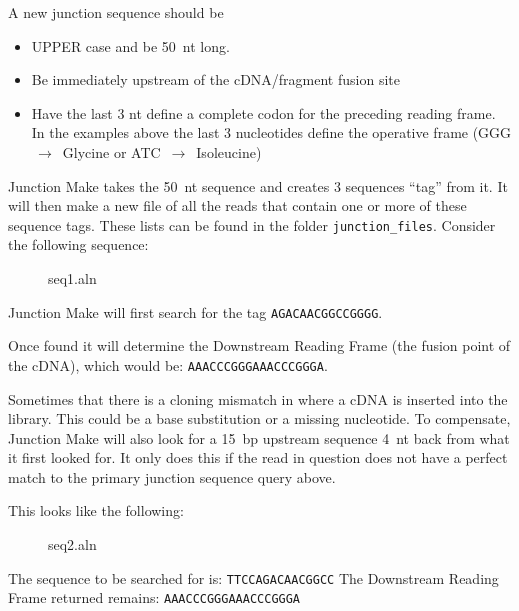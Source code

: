 \documentclass[11pt,fleqn]{book} %
\newcommand{\JunctionMake}{{\color{Blue} Junction Make }}
\begin{document}
\begin{remark}
A new junction sequence should be 
\begin{itemize}
	\item UPPER case and be 50~nt long.
	\item Be immediately upstream of the cDNA/fragment fusion site
	\item Have the last 3 nt define a complete codon for the preceding reading frame. In the examples above the last 3 nucleotides define the operative frame (GGG $\,\to\,$ Glycine or ATC $\,\to\,$ Isoleucine)
\end{itemize}
\end{remark}



\JunctionMake takes the 50~nt sequence and creates 3 sequences ``tag'' from it.  It will then make a new file of all the reads that contain one or more of these sequence tags.  These lists can be found in the folder \texttt{junction\_files}. Consider the following sequence:

\begin{figure}[!ht]
\centering
\begin{texshade}{seq1.aln}
	\hideconsensus
	\hidenumbering
\end{texshade}
\end{figure}

\JunctionMake  will first search for the tag \texttt{AGACAACGGCCGGGG}. 

Once found it will determine the  Downstream Reading Frame (the fusion point of the cDNA), which would be: \texttt{AAACCCGGGAAACCCGGGA}.

\vspace{10pt}

Sometimes that there is a cloning mismatch in where a cDNA is inserted into the library. This could be a base substitution or a missing nucleotide. To compensate, \JunctionMake will also look for a 15~bp upstream sequence 4~nt back from what it first looked for. It only does this if the read in question does not have a perfect match to the primary junction sequence query above.

This looks like the following:
\begin{figure}[!ht]
\centering
\begin{texshade}{seq2.aln}
	\hideconsensus
	\hidenumbering
\end{texshade}
\end{figure}
The sequence to be searched for is: \texttt{TTCCAGACAACGGCC}
The Downstream Reading Frame returned remains: \texttt{AAACCCGGGAAACCCGGGA}
\end{document}
